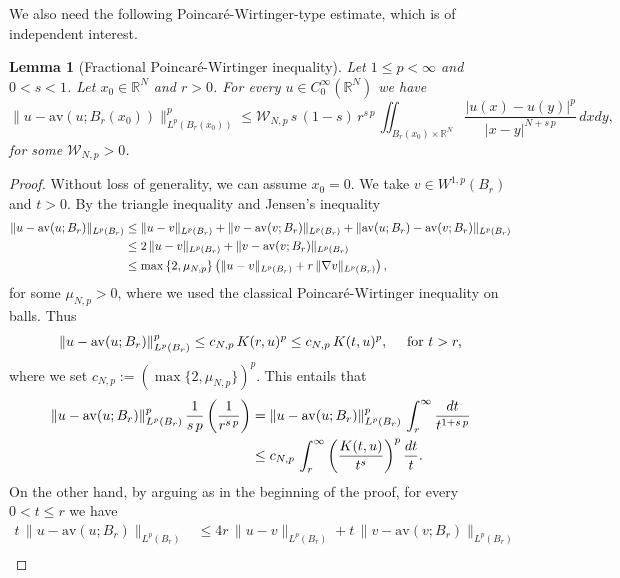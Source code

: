 \documentclass{amsart}
\newtheorem{lemma}[theorem]{Lemma}
\theoremstyle{definition}
\numberwithin{equation}{section}
\begin{document}
We also need the following Poincar\'e-Wirtinger-type estimate, which is of independent interest. 

\begin{lemma}[Fractional Poincar\'e-Wirtinger inequality] \label{lm:poincare-wirtinger}
	Let $1 \le p < \infty$ and $0 < s < 1$. Let $x_0 \in \mathbb{R}^N$ and $r > 0$.
	For every $u \in C^\infty_0(\mathbb{R}^N)$ we have 
	\begin{equation*}\label{ineq:poin-wirtinger}
		\|u - \mathrm{av}(u; B_r(x_0))\|^{p}_{L^p(B_r(x_0))} \le \mathcal{W}_{N,p}\,s\,(1-s)\,r^{s\,p}\,\iint_{B_r(x_0) \times \mathbb{R}^N} \frac{|u(x) - u(y)|^p}{|x-y|^{N+s\,p}}\,dxdy,
	\end{equation*}
	for some $\mathcal{W}_{N, p} > 0$.
\end{lemma}
\begin{proof} 
	Without loss of generality, we can assume $x_0 = 0$. We take $v \in W^{1,p}(B_r)$ and $t > 0$. By the triangle inequality and Jensen's inequality 
	\[
	\begin{split}
		\|u - {\rm av}(u; B_r)\|_{L^p(B_r)} &\le \|u-v\|_{L^p(B_r)} + \|v - {\rm av}(v; B_r)\|_{L^p(B_r)} + \|{\rm av}(u; B_r) - {\rm av}(v; B_r)\|_{L^p(B_r)}\\
		&\le 2\,\|u - v\|_{L^p(B_r)} + \|v - {\rm av}(v; B_r)\|_{L^p(B_r)} \\
		&\le \max\left\{2, \mu_{N,p} \right\} \left( \|u - v\|_{L^p(B_r)}	+ r\,\|\nabla v\|_{L^p(B_r)} \right),
	\end{split}
	\]
	for some $\mu_{N,p} > 0$, where we used the classical Poincar\'e-Wirtinger inequality on balls. Thus
	\[
	\|u - {\rm av}(u; B_r)\|^p_{L^p(B_r)} \le c_{N,p}\,K(r, u)^p \le c_{N,p}\,K(t, u)^p, \quad \mbox{ for } t> r,
	\]
	where we set $c_{N,p} := \left(\max\{2, \mu_{N,p}\}\right)^p$.
	This entails that 
	\begin{equation} \label{dall-infinito}
		\begin{split}
			\|u - {\rm av}(u; B_r)\|^p_{L^p(B_r)}\,\frac{1}{s\,p} \left(\frac{1}{r^{s\,p}}\right) &= \|u - {\rm av}(u; B_r)\|^p_{L^p(B_r)}\,\int_{r}^{\infty}\frac{dt}{t^{1+s\,p}}\\
			&\le c_{N,p}\,\int_{r}^{\infty} \left(\frac{K(t,u)}{t^s}\right)^p \frac{dt}{t}.
		\end{split}
	\end{equation}
	On the other hand, by arguing as in the beginning of the proof, for every $0 < t \le r$ we have 	
	\[
	\begin{split}
		t\,\|u - \mathrm{av}(u; B_r)\|_{L^p(B_r)} &\le 4r\,\|u - v\|_{L^p(B_r)} + t\,\|v-\mathrm{av}(v;B_r)\|_{L^p(B_r)} \\

\end{split}\]
\end{proof}
\end{document}
